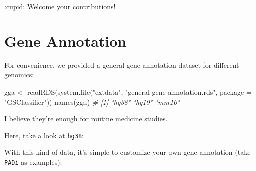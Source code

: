 \documentclass[
  12pt,
]{book}
\newenvironment{Shaded}{\begin{snugshade}}{\end{snugshade}}
\newcommand{\AttributeTok}[1]{\textcolor[rgb]{0.77,0.63,0.00}{#1}}
\newcommand{\CommentTok}[1]{\textcolor[rgb]{0.56,0.35,0.01}{\textit{#1}}}
\newcommand{\FunctionTok}[1]{\textcolor[rgb]{0.00,0.00,0.00}{#1}}
\newcommand{\NormalTok}[1]{#1}
\newcommand{\OtherTok}[1]{\textcolor[rgb]{0.56,0.35,0.01}{#1}}
\newcommand{\SpecialCharTok}[1]{\textcolor[rgb]{0.00,0.00,0.00}{#1}}
\newcommand{\StringTok}[1]{\textcolor[rgb]{0.31,0.60,0.02}{#1}}
\begin{document}
:cupid: Welcome your contributions!

\hypertarget{gene-annotation}{%
\section{Gene Annotation}\label{gene-annotation}}

For convenience, we provided a general gene annotation dataset for different genomics:

\begin{Shaded}
\begin{Highlighting}[]
\NormalTok{gga }\OtherTok{\textless{}{-}} \FunctionTok{readRDS}\NormalTok{(}\FunctionTok{system.file}\NormalTok{(}\StringTok{"extdata"}\NormalTok{, }\StringTok{"general{-}gene{-}annotation.rds"}\NormalTok{, }\AttributeTok{package =} \StringTok{"GSClassifier"}\NormalTok{))}
\FunctionTok{names}\NormalTok{(gga)}
\CommentTok{\# [1] "hg38" "hg19" "mm10"}
\end{Highlighting}
\end{Shaded}

I believe they're enough for routine medicine studies.

Here, take a look at \texttt{hg38}:

\begin{Shaded}
\end{Shaded}

With this kind of data, it's simple to customize your own gene annotation (take \texttt{PADi} as examples):

\begin{Shaded}
\end{Shaded}
\end{document}
